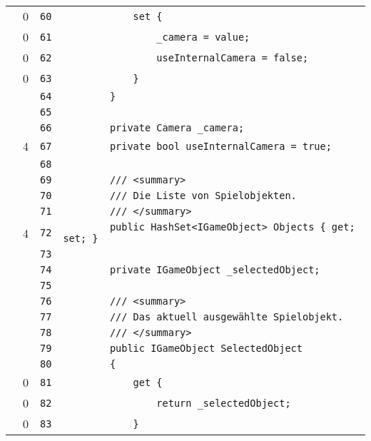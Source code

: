 \documentclass[a4paper,10pt]{article}
\begin{document}
\begin{longtable}[l]{lrrl}
\cellcolor{red} & 0 & \verb~60~ & \verb~            set {~\\
\cellcolor{red} & 0 & \verb~61~ & \verb~                _camera = value;~\\
\cellcolor{red} & 0 & \verb~62~ & \verb~                useInternalCamera = false;~\\
\cellcolor{red} & 0 & \verb~63~ & \verb~            }~\\
\cellcolor{gray} &  & \verb~64~ & \verb~        }~\\
\cellcolor{gray} &  & \verb~65~ & \verb~~\\
\cellcolor{gray} &  & \verb~66~ & \verb~        private Camera _camera;~\\
\cellcolor{green} & 4 & \verb~67~ & \verb~        private bool useInternalCamera = true;~\\
\cellcolor{gray} &  & \verb~68~ & \verb~~\\
\cellcolor{gray} &  & \verb~69~ & \verb~        /// <summary>~\\
\cellcolor{gray} &  & \verb~70~ & \verb~        /// Die Liste von Spielobjekten.~\\
\cellcolor{gray} &  & \verb~71~ & \verb~        /// </summary>~\\
\cellcolor{green} & 4 & \verb~72~ & \verb~        public HashSet<IGameObject> Objects { get; set; }~\\
\cellcolor{gray} &  & \verb~73~ & \verb~~\\
\cellcolor{gray} &  & \verb~74~ & \verb~        private IGameObject _selectedObject;~\\
\cellcolor{gray} &  & \verb~75~ & \verb~~\\
\cellcolor{gray} &  & \verb~76~ & \verb~        /// <summary>~\\
\cellcolor{gray} &  & \verb~77~ & \verb~        /// Das aktuell ausgewählte Spielobjekt.~\\
\cellcolor{gray} &  & \verb~78~ & \verb~        /// </summary>~\\
\cellcolor{gray} &  & \verb~79~ & \verb~        public IGameObject SelectedObject~\\
\cellcolor{gray} &  & \verb~80~ & \verb~        {~\\
\cellcolor{red} & 0 & \verb~81~ & \verb~            get {~\\
\cellcolor{red} & 0 & \verb~82~ & \verb~                return _selectedObject;~\\
\cellcolor{red} & 0 & \verb~83~ & \verb~            }~\\

\end{longtable}
\end{document}
